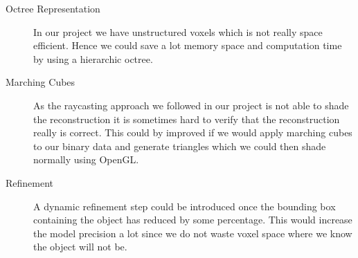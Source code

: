 \documentclass[10pt,twocolumn,letterpaper]{article}
\begin{document}
\begin{description}
	\item[Octree Representation] In our project we have unstructured voxels which is not really space efficient. Hence we could save a lot memory space and computation time by using a hierarchic octree.
	\item[Marching Cubes] As the raycasting approach we followed in our project is not able to shade the reconstruction it is sometimes hard to verify that the reconstruction really is correct. This could by improved if we would apply marching cubes to our binary data and generate triangles which we could then shade normally using OpenGL.
	\item[Refinement] A dynamic refinement step could be introduced once the bounding box containing the object has reduced by some percentage. This would increase the model precision a lot since we do not waste voxel space where we know the object will not be.
\end{description}


{\small


}
\end{document}
